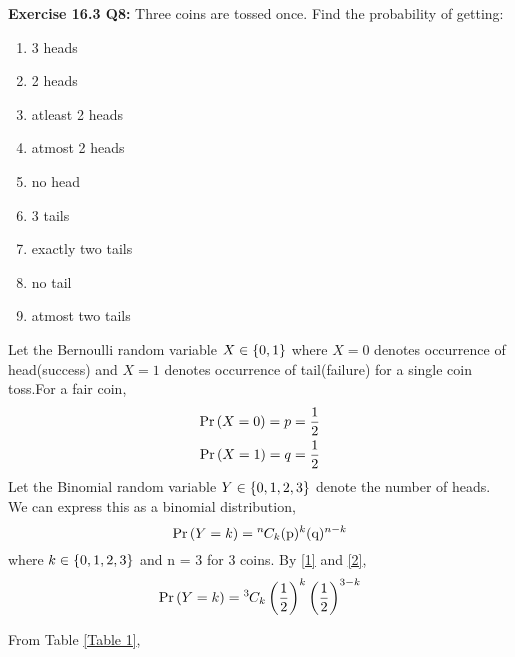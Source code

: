 \documentclass[journal,12pt,two column]{IEEEtran}
\begin{document}
\textbf{Exercise 16.3 Q8:} Three coins are tossed once. Find the probability of getting:
\begin{enumerate}[label = (\roman*)]
    \item 3 heads 
    \item 2 heads 
    \item atleast 2 heads 
    \item atmost 2 heads 
    \item no head 
    \item 3 tails 
    \item exactly two tails 
    \item no tail 
    \item atmost two tails
\end{enumerate}
\solution
Let the Bernoulli random variable $X \in \left\{0,1\right\}$ where $X = 0$ denotes occurrence of head(success) and $X = 1$ denotes occurrence of tail(failure) for a single coin toss.For a fair coin,
\begin{align}
    \Pr\left(X = 0\right) = p = \frac{1}{2} \label{1}\\
    \Pr\left(X = 1\right) = q = \frac{1}{2} \label{2}
\end{align}
Let the Binomial random variable $Y \in \left\{0,1,2,3\right\}$ denote the number of heads. We can express this as a binomial distribution,
\begin{equation}
    \Pr\left(Y = k\right) = {{}^{n}\mkern-1muC_{k}} (\text{p})^k (\text{q})^{n-k}  
\end{equation}
where $k \in \left\{0,1,2,3\right\}$ and n = 3 for 3 coins. By \eqref{1} and \eqref{2},
\begin{equation}
    \Pr\left(Y = k\right) = {{}^{3}\mkern-1muC_{k}} \left(\frac{1}{2}\right)^k \left(\frac{1}{2}\right)^{3-k}  
\end{equation}
\begin{table}[ht!]
    \centering
    
    \caption{}
    \label{Table 1}
\end{table}
From Table \ref{Table 1},
\end{document}
